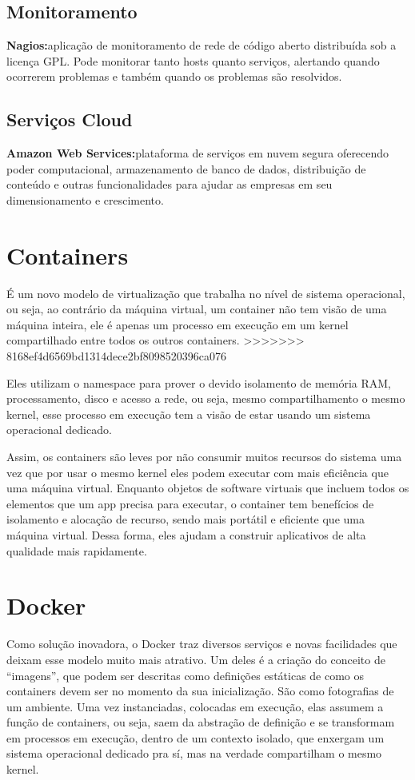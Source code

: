 \subsection{Monitoramento}

\textbf{Nagios:}aplicação de monitoramento de rede de código aberto distribuída sob a licença GPL. Pode monitorar tanto hosts quanto serviços, alertando quando ocorrerem problemas e também quando os problemas são resolvidos.

\subsection{Serviços Cloud}

\textbf{Amazon Web Services:}plataforma de serviços em nuvem segura oferecendo poder computacional, armazenamento de banco de dados, distribuição de conteúdo e outras funcionalidades para ajudar as empresas em seu dimensionamento e crescimento.

\section{Containers}
É um novo modelo de virtualização que trabalha no nível de sistema operacional, ou seja, ao contrário da máquina virtual, um container não tem visão de uma máquina inteira, ele é apenas um processo em execução em um kernel compartilhado entre todos os outros containers.
>>>>>>> 8168ef4d6569bd1314dece2bf8098520396ca076

Eles utilizam o namespace para prover o devido isolamento de memória RAM, processamento, disco e acesso a rede, ou seja, mesmo compartilhamento o mesmo kernel, esse processo em execução tem a visão de estar usando um sistema operacional dedicado.

Assim, os containers são leves por não consumir muitos recursos do sistema uma vez que por usar o mesmo kernel eles podem executar com mais eficiência que uma máquina virtual. Enquanto objetos de software virtuais que incluem todos os elementos que um app precisa para executar, o container tem benefícios de isolamento e alocação de recurso, sendo mais portátil e eficiente que uma máquina virtual. Dessa forma, eles ajudam a construir aplicativos de alta qualidade mais rapidamente.

\section{Docker}
Como solução inovadora, o Docker traz diversos serviços e novas facilidades que deixam esse modelo muito mais atrativo. Um deles é a criação do conceito de “imagens”, que podem ser descritas como definições estáticas de como os containers devem ser no momento da sua inicialização. São como fotografias de um ambiente. Uma vez instanciadas, colocadas em execução, elas assumem a função de containers, ou seja, saem da abstração de definição e se transformam em processos em execução, dentro de um contexto isolado, que enxergam um sistema operacional dedicado pra sí, mas na verdade compartilham o mesmo kernel.

